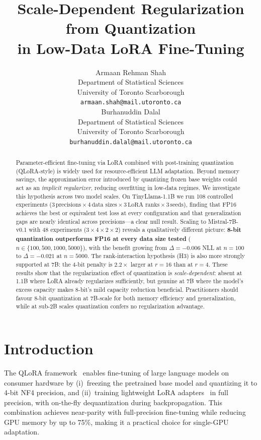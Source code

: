 \documentclass{article}
\title{Scale-Dependent Regularization from Quantization\\
       in Low-Data LoRA Fine-Tuning}
\author{%
  Armaan Rehman Shah \\
  Department of Statistical Sciences \\
  University of Toronto Scarborough \\
  \texttt{armaan.shah@mail.utoronto.ca} \\
  \And
  Burhanuddin Dalal \\
  Department of Statistical Sciences \\
  University of Toronto Scarborough \\
  \texttt{burhanuddin.dalal@mail.utoronto.ca} \\
}
\begin{document}
\maketitle

\begin{abstract}
Parameter-efficient fine-tuning via LoRA combined with post-training quantization
(QLoRA-style) is widely used for resource-efficient LLM adaptation. Beyond memory
savings, the approximation error introduced by quantizing frozen base weights could
act as an \emph{implicit regularizer}, reducing overfitting in low-data regimes.
We investigate this hypothesis across two model scales. On TinyLlama-1.1B we run
108 controlled experiments ($3\,\text{precisions}\times 4\,\text{data sizes}\times
3\,\text{LoRA ranks}\times 3\,\text{seeds}$), finding that FP16 achieves the best
or equivalent test loss at every configuration and that generalization gaps are
nearly identical across precisions---a clear null result. Scaling to
Mistral-7B-v0.1 with 48 experiments ($3\times 4\times 2\times 2$) reveals a
qualitatively different picture: \textbf{8-bit quantization outperforms FP16 at
every data size tested} ($n\in\{100,500,1000,5000\}$), with the benefit growing
from $\Delta{=}{-}0.006$ NLL at $n{=}100$ to $\Delta{=}{-}0.021$ at $n{=}5000$.
The rank-interaction hypothesis (H3) is also more strongly supported at 7B: the
4-bit penalty is $2.2\times$ larger at $r{=}16$ than at $r{=}4$.  These results
show that the regularization effect of quantization is \emph{scale-dependent}:
absent at 1.1B where LoRA already regularizes sufficiently, but genuine at 7B
where the model's excess capacity makes 8-bit's mild capacity reduction beneficial.
Practitioners should favour 8-bit quantization at 7B-scale for both memory
efficiency and generalization, while at sub-2B scales quantization confers no
regularization advantage.
\end{abstract}

\section{Introduction}

The QLoRA framework~\citep{dettmers2023qlora} enables fine-tuning of large language
models on consumer hardware by (i)~freezing the pretrained base model and quantizing
it to 4-bit NF4 precision, and (ii)~training lightweight LoRA
adapters~\citep{hu2021lora} in full precision, with on-the-fly dequantization during
backpropagation. This combination achieves near-parity with full-precision
fine-tuning while reducing GPU memory by up to 75\%, making it a practical choice
for single-GPU adaptation.
\end{document}
